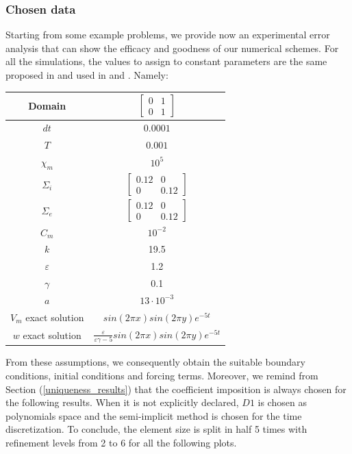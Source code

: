 \documentclass[a4paper,11pt]{article}
\begin{document}
\subsubsection{Chosen data}
Starting from some example problems, we provide now an experimental error analysis that can show the efficacy and goodness of our numerical schemes. For all the simulations, the values to assign to constant parameters are the same proposed in \cite{bagnara} and used in \cite{andreotti} and \cite{marta}. Namely:
\begin{center}
	\begin{tabular}{|c|c|} 
		\hline 
		\rule[-4mm]{0mm}{1cm}
		Domain & $\begin{bmatrix} 0 & 1 \\ 0 & 1 \end{bmatrix}$ \\
		\hline 
		\rule[-4mm]{0mm}{1cm}
		$dt$ & $0.0001$ \\
		\hline
		\rule[-4mm]{0mm}{1cm}
		$T$ & $0.001$ \\
		\hline
		\rule[-4mm]{0mm}{1cm}
		$\chi_m$ & $10^5$ \\
		\hline
		\rule[-4mm]{0mm}{1cm}
		$\Sigma_i$ & $\begin{bmatrix} 0.12 & 0 \\ 0 & 0.12 \end{bmatrix}$ \\
		\hline
		\rule[-4mm]{0mm}{1cm}
		$\Sigma_e$ & $\begin{bmatrix} 0.12 & 0 \\ 0 & 0.12 \end{bmatrix}$ \\
		\hline
		\rule[-4mm]{0mm}{1cm}
		$C_m$ & $10^{-2}$ \\
		\hline
		\rule[-4mm]{0mm}{1cm}
		$k$ & 19.5 \\ 
		\hline
		\rule[-4mm]{0mm}{1cm}
		$\varepsilon$ & 1.2 \\
		\hline
		\rule[-4mm]{0mm}{1cm}
		$\gamma$ & 0.1 \\
		\hline
		\rule[-4mm]{0mm}{1cm}
		$a$ & $13 \cdot 10^{-3}$ \\
		\hline
		\rule[-4mm]{0mm}{1cm}
		$V_m$ exact solution & $sin(2 \pi x) sin(2 \pi y) e^{-5 t}$ \\
		\hline
		\rule[-4mm]{0mm}{1cm}
		$w$ exact solution & $\frac{\varepsilon}{\varepsilon \gamma-5} sin(2 \pi x) sin(2 \pi y) e^{-5 t}$ \\
		\hline
		
	\end{tabular}
\end{center}
\vspace{3mm}
\noindent From these assumptions, we consequently obtain the suitable boundary conditions, initial conditions and forcing terms. Moreover, we remind from Section (\ref{uniqueness_results}) that the coefficient imposition is always chosen for the following results. When it is not explicitly declared, $D1$ is chosen as polynomials space and the semi-implicit method is chosen for the time discretization. To conclude, the element size is split in half 5 times with refinement levels from 2 to 6 for all the following plots.
\end{document}
